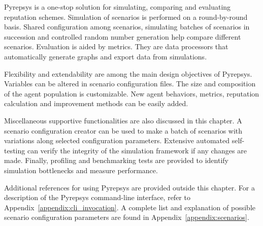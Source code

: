 \documentclass[%
    ]{\PathToTumTemplate/thesis/tum_thesis}
\begin{document}
Pyrepsys is a one-stop solution for simulating, comparing and evaluating reputation schemes.
Simulation of scenarios is performed on a round-by-round basis.
Shared configuration among scenarios, simulating batches of scenarios in succession and controlled random number generation help compare different scenarios.
Evaluation is aided by metrics.
They are data processors that automatically generate graphs and export data from simulations.

Flexibility and extendability are among the main design objectives of Pyrepsys.
Variables can be altered in scenario configuration files.
The size and composition of the agent population is customizable.
New agent behaviors, metrics, reputation calculation and improvement methods can be easily added.

Miscellaneous supportive functionalities are also discussed in this chapter.
A scenario configuration creator can be used to make a batch of scenarios with variations along selected configuration parameters.
Extensive automated self-testing can verify the integrity of the simulation framework if any changes are made.
Finally, profiling and benchmarking tests are provided to identify simulation bottlenecks and measure performance.

Additional references for using Pyrepsys are provided outside this chapter.
For a description of the Pyrepsys command-line interface, refer to Appendix~\ref{appendix:cli_invocation}.
A complete list and explanation of possible scenario configuration parameters are found in Appendix~\ref{appendix:scenarios}.

\end{document}
